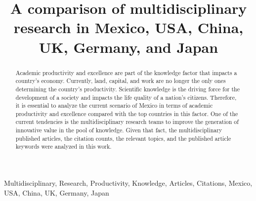 \documentclass[conference]{IEEEtran}
\begin{document}
\title{A comparison of multidisciplinary research in Mexico, USA, China, UK, Germany, and Japan \\
}

\author{
\and
{}
}

\maketitle
\begin{abstract}
Academic productivity and excellence are part of the knowledge factor that impacts a country's economy. Currently, land, capital, and work are no longer the only ones determining the country's productivity. Scientific knowledge is the driving force for the development of a society and impacts the life quality of a nation's citizens. Therefore, it is essential to analyze the current scenario of Mexico in terms of academic productivity and excellence compared with the top countries in this factor. One of the current tendencies is the multidisciplinary research teams to improve the generation of innovative value in the pool of knowledge. Given that fact, the multidisciplinary published articles, the citation counts, the relevant topics, and the published article keywords were analyzed in this work.
\end{abstract}

\begin{IEEEkeywords}
Multidisciplinary, Research, Productivity, Knowledge, Articles, Citations, Mexico, USA, China, UK, Germany, Japan
\end{IEEEkeywords}
\end{document}
